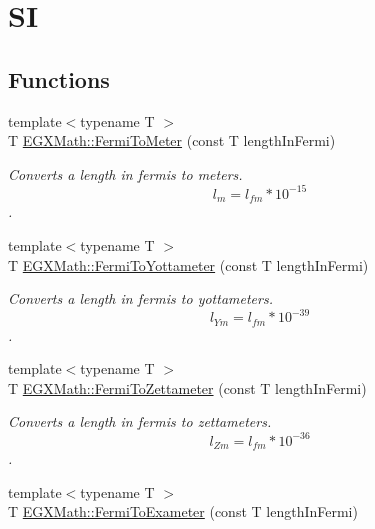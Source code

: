 \hypertarget{group___e_g_x_math-_conversions-_length_conversions-_non-_s_i-_fermi-_s_i}{}\section{SI}
\label{group___e_g_x_math-_conversions-_length_conversions-_non-_s_i-_fermi-_s_i}
\subsection*{Functions}
\begin{DoxyCompactItemize}
\item 
{\footnotesize template$<$typename T $>$ }\\T \mbox{\hyperlink{group___e_g_x_math-_conversions-_length_conversions-_non-_s_i-_fermi-_s_i_ga4b46bec209c12abbb998b2301d273d28}{E\+G\+X\+Math\+::\+Fermi\+To\+Meter}} (const T length\+In\+Fermi)
\begin{DoxyCompactList}\small\item\em Converts a length in fermis to meters. \[ l_{m}=l_{fm} * 10^{-15} \]. \end{DoxyCompactList}\item 
{\footnotesize template$<$typename T $>$ }\\T \mbox{\hyperlink{group___e_g_x_math-_conversions-_length_conversions-_non-_s_i-_fermi-_s_i_ga1d4accde11444a024a737b2c007dfe26}{E\+G\+X\+Math\+::\+Fermi\+To\+Yottameter}} (const T length\+In\+Fermi)
\begin{DoxyCompactList}\small\item\em Converts a length in fermis to yottameters. \[ l_{Ym}=l_{fm} * 10^{-39} \]. \end{DoxyCompactList}\item 
{\footnotesize template$<$typename T $>$ }\\T \mbox{\hyperlink{group___e_g_x_math-_conversions-_length_conversions-_non-_s_i-_fermi-_s_i_ga2ca47f79138a4edf88f4ffa2849ca35d}{E\+G\+X\+Math\+::\+Fermi\+To\+Zettameter}} (const T length\+In\+Fermi)
\begin{DoxyCompactList}\small\item\em Converts a length in fermis to zettameters. \[ l_{Zm}=l_{fm} * 10^{-36} \]. \end{DoxyCompactList}\item 
{\footnotesize template$<$typename T $>$ }\\T \mbox{\hyperlink{group___e_g_x_math-_conversions-_length_conversions-_non-_s_i-_fermi-_s_i_ga5070d7a2d963b8698fe00651db559941}{E\+G\+X\+Math\+::\+Fermi\+To\+Exameter}} (const T length\+In\+Fermi)

\end{DoxyCompactItemize}
